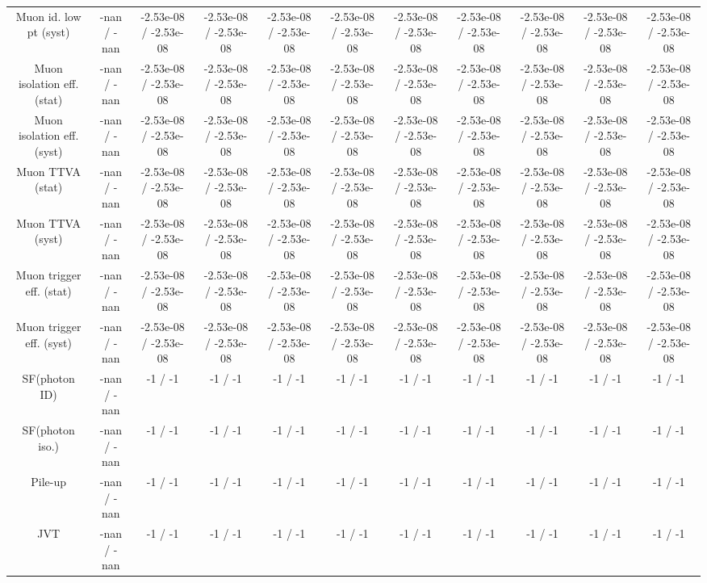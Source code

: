 \begin{table}[htbp]
\begin{center}
\begin{tabular}{|c|c|c|c|c|c|c|c|c|c|c|}
  Muon id. low pt (syst) & -nan / -nan & -2.53e-08 / -2.53e-08 & -2.53e-08 / -2.53e-08 & -2.53e-08 / -2.53e-08 & -2.53e-08 / -2.53e-08 & -2.53e-08 / -2.53e-08 & -2.53e-08 / -2.53e-08 & -2.53e-08 / -2.53e-08 & -2.53e-08 / -2.53e-08 & -2.53e-08 / -2.53e-08 \\ 
  Muon isolation eff. (stat) & -nan / -nan & -2.53e-08 / -2.53e-08 & -2.53e-08 / -2.53e-08 & -2.53e-08 / -2.53e-08 & -2.53e-08 / -2.53e-08 & -2.53e-08 / -2.53e-08 & -2.53e-08 / -2.53e-08 & -2.53e-08 / -2.53e-08 & -2.53e-08 / -2.53e-08 & -2.53e-08 / -2.53e-08 \\ 
  Muon isolation eff. (syst) & -nan / -nan & -2.53e-08 / -2.53e-08 & -2.53e-08 / -2.53e-08 & -2.53e-08 / -2.53e-08 & -2.53e-08 / -2.53e-08 & -2.53e-08 / -2.53e-08 & -2.53e-08 / -2.53e-08 & -2.53e-08 / -2.53e-08 & -2.53e-08 / -2.53e-08 & -2.53e-08 / -2.53e-08 \\ 
  Muon TTVA (stat) & -nan / -nan & -2.53e-08 / -2.53e-08 & -2.53e-08 / -2.53e-08 & -2.53e-08 / -2.53e-08 & -2.53e-08 / -2.53e-08 & -2.53e-08 / -2.53e-08 & -2.53e-08 / -2.53e-08 & -2.53e-08 / -2.53e-08 & -2.53e-08 / -2.53e-08 & -2.53e-08 / -2.53e-08 \\ 
  Muon TTVA (syst) & -nan / -nan & -2.53e-08 / -2.53e-08 & -2.53e-08 / -2.53e-08 & -2.53e-08 / -2.53e-08 & -2.53e-08 / -2.53e-08 & -2.53e-08 / -2.53e-08 & -2.53e-08 / -2.53e-08 & -2.53e-08 / -2.53e-08 & -2.53e-08 / -2.53e-08 & -2.53e-08 / -2.53e-08 \\ 
  Muon trigger eff. (stat) & -nan / -nan & -2.53e-08 / -2.53e-08 & -2.53e-08 / -2.53e-08 & -2.53e-08 / -2.53e-08 & -2.53e-08 / -2.53e-08 & -2.53e-08 / -2.53e-08 & -2.53e-08 / -2.53e-08 & -2.53e-08 / -2.53e-08 & -2.53e-08 / -2.53e-08 & -2.53e-08 / -2.53e-08 \\ 
  Muon trigger eff. (syst) & -nan / -nan & -2.53e-08 / -2.53e-08 & -2.53e-08 / -2.53e-08 & -2.53e-08 / -2.53e-08 & -2.53e-08 / -2.53e-08 & -2.53e-08 / -2.53e-08 & -2.53e-08 / -2.53e-08 & -2.53e-08 / -2.53e-08 & -2.53e-08 / -2.53e-08 & -2.53e-08 / -2.53e-08 \\ 
  SF(photon ID) & -nan / -nan & -1 / -1 & -1 / -1 & -1 / -1 & -1 / -1 & -1 / -1 & -1 / -1 & -1 / -1 & -1 / -1 & -1 / -1 \\ 
  SF(photon iso.) & -nan / -nan & -1 / -1 & -1 / -1 & -1 / -1 & -1 / -1 & -1 / -1 & -1 / -1 & -1 / -1 & -1 / -1 & -1 / -1 \\ 
  Pile-up & -nan / -nan & -1 / -1 & -1 / -1 & -1 / -1 & -1 / -1 & -1 / -1 & -1 / -1 & -1 / -1 & -1 / -1 & -1 / -1 \\ 
  JVT & -nan / -nan & -1 / -1 & -1 / -1 & -1 / -1 & -1 / -1 & -1 / -1 & -1 / -1 & -1 / -1 & -1 / -1 & -1 / -1 \\ 

\end{tabular}
\end{center}
\end{table}
